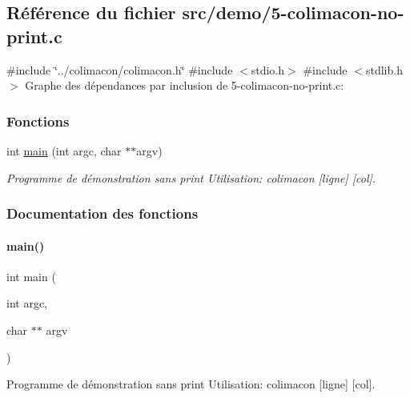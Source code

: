 \hypertarget{5-colimacon-no-print_8c}{}\subsection{Référence du fichier src/demo/5-\/colimacon-\/no-\/print.c}
\label{5-colimacon-no-print_8c}
{\ttfamily \#include \char`\"{}../colimacon/colimacon.\+h\char`\"{}}\newline
{\ttfamily \#include $<$stdio.\+h$>$}\newline
{\ttfamily \#include $<$stdlib.\+h$>$}\newline
Graphe des dépendances par inclusion de 5-\/colimacon-\/no-\/print.c\+:
\subsubsection*{Fonctions}
\begin{DoxyCompactItemize}
\item 
int \hyperlink{5-colimacon-no-print_8c_a3c04138a5bfe5d72780bb7e82a18e627}{main} (int argc, char $\ast$$\ast$argv)
\begin{DoxyCompactList}\small\item\em Programme de démonstration sans print Utilisation\+: colimacon \mbox{[}ligne\mbox{]} \mbox{[}col\mbox{]}. \end{DoxyCompactList}\end{DoxyCompactItemize}


\subsubsection{Documentation des fonctions}
\mbox{\label{5-colimacon-no-print_8c_a3c04138a5bfe5d72780bb7e82a18e627}} 
\paragraph{\texorpdfstring{main()}{main()}}
{\footnotesize\ttfamily int main (\begin{DoxyParamCaption}\item[{int}]{argc,  }\item[{char $\ast$$\ast$}]{argv }\end{DoxyParamCaption})}



Programme de démonstration sans print Utilisation\+: colimacon \mbox{[}ligne\mbox{]} \mbox{[}col\mbox{]}. 

